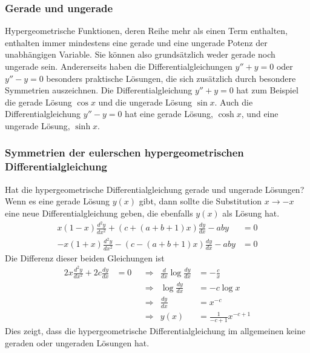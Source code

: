 \subsubsection{Gerade und ungerade}
Hypergeometrische Funktionen, deren Reihe mehr als einen Term
enthalten, enthalten immer mindestens eine gerade und eine ungerade
Potenz der unabhängigen Variable.
Sie können also grundsätzlich weder gerade noch ungerade sein.
Andererseits haben die Differentialgleichungen $y''+y=0$ oder $y''-y=0$
besonders praktische Lösungen, die sich zusätzlich durch besondere
Symmetrien auszeichnen.
Die Differentialgleichung $y''+y=0$ hat zum Beispiel die gerade
Lösung $\cos x$ und die ungerade Lösung $\sin x$.
Auch die Differentialgleichung $y''-y=0$ hat eine gerade Lösung,
$\cosh x$, und eine ungerade Lösung, $\sinh x$.

\subsubsection{Symmetrien der eulerschen hypergeometrischen
Differentialgleichung}
%
Hat die hypergeometrische Differentialgleichung gerade und
ungerade Lösungen?
Wenn es eine gerade Lösung $y(x)$ gibt, dann sollte die Substitution
$x \to -x$ eine neue Differentialgleichung geben, die ebenfalls $y(x)$
als Lösung hat.
\begin{align*}
 x(1-x)\frac{d^2y}{dx^2} + (c+(a+b+1)x)\frac{dy}{dx}-aby&=0
\\
-x(1+x)\frac{d^2y}{dx^2} - (c-(a+b+1)x)\frac{dy}{dx}-aby&=0
\end{align*}
Die Differenz dieser beiden Gleichungen ist
\begin{align*}
2x\frac{d^2y}{dx^2} +2c \frac{dy}{dx}&=0
&&\Rightarrow&
\frac{d}{dx} \log \frac{dy}{dx} &= -\frac{c}{x}
\\
&&&\Rightarrow&
\log \frac{dy}{dx} &= -c\log x
\\
&&&\Rightarrow&
\frac{dy}{dx} &= x^{-c}
\\
&&&\Rightarrow&
y(x) &= \frac{1}{-c+1}x^{-c+1}
\end{align*}
Dies zeigt, dass die hypergeometrische Differentialgleichung im
allgemeinen keine geraden oder ungeraden Lösungen hat.

